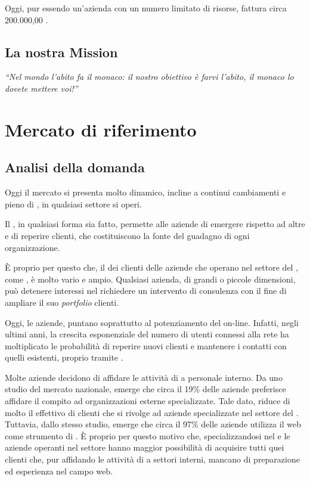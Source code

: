 Oggi, pur essendo un'azienda con un numero limitato di risorse, fattura circa  200.000,00 \text{\euro}.

\subsection{La nostra Mission}

\textit{``Nel mondo l'abito fa il monaco: il nostro obiettivo è farvi l'abito, il monaco lo dovete mettere voi!''}



\section{Mercato di riferimento} 
\subsection{Analisi della domanda} %
Oggi il mercato si presenta molto dinamico, incline a continui cambiamenti e pieno di  , in qualsiasi settore si operi.

Il \mktg , in qualsiasi forma sia fatto, permette alle aziende di emergere rispetto ad altre e di reperire clienti, che costituiscono la fonte del guadagno di ogni organizzazione.

È  proprio per questo che, il  dei clienti delle aziende che operano nel settore del \mktg, come \customer , è molto vario e ampio. Qualsiasi azienda, di grandi o piccole dimensioni, può detenere interessi nel richiedere un intervento di consulenza \mktg con il fine di ampliare il suo \textit{portfolio} clienti.

Oggi, le aziende, puntano soprattutto al potenziamento del \mktg on-line. Infatti, negli ultimi anni, la crescita esponenziale del numero di utenti connessi alla rete ha moltiplicato le probabilità di reperire nuovi clienti e mantenere i contatti con quelli esistenti, proprio tramite .

Molte aziende decidono di affidare le attività di \mktg a personale interno. Da uno studio del mercato nazionale, emerge che circa il 19\% delle aziende preferisce affidare il compito ad organizzazioni esterne specializzate.
Tale dato, riduce di molto il  effettivo di clienti che si rivolge ad aziende specializzate nel settore del \mktg.
Tuttavia, dallo stesso studio, emerge che circa il 97\% delle aziende utilizza il web come strumento di \mktg . È  proprio per questo motivo che, specializzandosi nel \mktg {} e  le aziende operanti nel settore hanno maggior possibilità di acquisire tutti quei clienti che, pur affidando le attività di \mktg a settori interni,  mancano di preparazione ed esperienza nel campo web.
